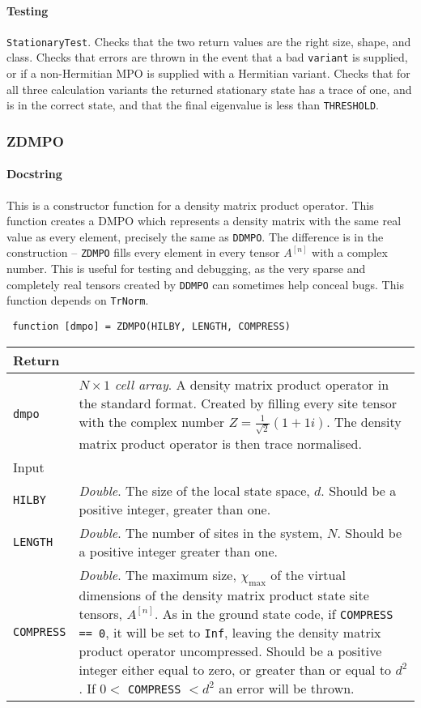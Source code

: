  \paragraph{Testing} \lstinline$StationaryTest$. Checks that the two return values are the right size, shape, and class. Checks that errors are thrown in the event that a bad \lstinline$variant$ is supplied, or if a non-Hermitian MPO is supplied with a Hermitian variant. Checks that for all three calculation variants the returned stationary state has a trace of one, and is in the correct state, and that the final eigenvalue is less than \lstinline$THRESHOLD$. 

 \subsubsection{ZDMPO}
 \paragraph{Docstring} This is a constructor function for a density matrix product operator. This function creates a DMPO which represents a density matrix with the same real value as every element, precisely the same as \lstinline$DDMPO$. The difference is in the construction -- \lstinline$ZDMPO$ fills every element in every tensor \(A^{[n]}\) with a complex number. This is useful for testing and debugging, as the very sparse and completely real tensors created by \lstinline$DDMPO$ can sometimes help conceal bugs. This function depends on \lstinline$TrNorm$.
 \begin{lstlisting}
 function [dmpo] = ZDMPO(HILBY, LENGTH, COMPRESS) \end{lstlisting}
 \begin{longtabu}{X[1,l]X[4,l]}
 \hline
 Return & \\ \hline
 \lstinline$dmpo$ & \emph{\(N \times 1\) cell array}. A density matrix product operator in the standard format. Created by filling every site tensor with the complex number \(Z = \frac{1}{\sqrt{2}}(1 + 1i)\). The density matrix product operator is then trace normalised. \\ \hline
 Input & \\ \hline
 \lstinline$HILBY$ & \emph{Double}. The size of the local state space, \(d\). Should be a positive integer, greater than one.  \\
 \lstinline$LENGTH$ & \emph{Double}. The number of sites in the system, \(N\). Should be a positive integer greater than one. \\
 \lstinline$COMPRESS$ & \emph{Double}. The maximum size, \(\chi_{\mathrm{max}}\) of the virtual dimensions of the density matrix product state site tensors, \(A^{[n]}\). As in the ground state code, if \lstinline$COMPRESS == 0$, it will be set to \lstinline$Inf$, leaving the density matrix product operator uncompressed. Should be a positive integer either equal to zero, or greater than or equal to \(d^{2}\). If \(0 <\) \lstinline$COMPRESS$ \(< d^{2}\) an error will be thrown. \\
 \hline
 \end{longtabu}
